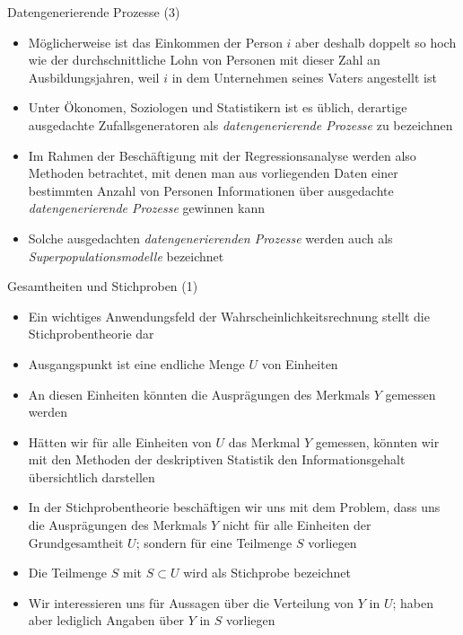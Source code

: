 \documentclass[9pt]{beamer}
\begin{document}
\begin{frame}{Datengenerierende Prozesse (3)}
\begin{itemize}
\item M\"{o}glicherweise ist das Einkommen der Person $i$ aber deshalb doppelt so hoch wie der durchschnittliche Lohn von Personen mit dieser Zahl an Ausbildungsjahren, weil $i$ in dem Unternehmen seines Vaters angestellt ist
\item Unter \"{O}konomen, Soziologen und Statistikern ist es \"{u}blich, derartige ausgedachte Zufallsgeneratoren als \emph{datengenerierende Prozesse} zu bezeichnen
\item Im Rahmen der Besch\"{a}ftigung mit der Regressionsanalyse werden also Methoden betrachtet, mit denen man aus vorliegenden Daten einer bestimmten Anzahl von Personen Informationen \"{u}ber ausgedachte \emph{datengenerierende Prozesse} gewinnen kann
\item Solche ausgedachten \emph{datengenerierenden Prozesse} werden auch als \emph{Superpopulationsmodelle} bezeichnet
\end{itemize}
\end{frame}




\begin{frame}{Gesamtheiten und Stichproben (1)}
\begin{itemize}
\item Ein wichtiges Anwendungsfeld der Wahrscheinlichkeitsrechnung stellt die Stichprobentheorie dar
\item Ausgangspunkt ist eine endliche Menge $U$ von Einheiten
\item An diesen Einheiten k\"{o}nnten die Auspr\"{a}gungen des Merkmals $Y$ gemessen werden
\item H\"{a}tten wir f\"{u}r alle Einheiten von $U$ das Merkmal $Y$ gemessen, k\"{o}nnten wir mit den Methoden der deskriptiven Statistik den Informationsgehalt \"{u}bersichtlich darstellen
\item In der Stichprobentheorie besch\"{a}ftigen wir uns mit dem Problem, dass uns die Auspr\"{a}gungen des Merkmals $Y$ nicht f\"{u}r alle Einheiten der Grundgesamtheit $U$; sondern f\"{u}r eine Teilmenge $S$ vorliegen
\item Die Teilmenge $S$ mit $S \subset U$ wird als Stichprobe bezeichnet
\item Wir interessieren uns f\"{u}r Aussagen \"{u}ber die Verteilung von $Y$ in $U$; haben aber lediglich Angaben \"{u}ber $Y$ in $S$ vorliegen
\end{itemize}
\end{frame}
\end{document}
